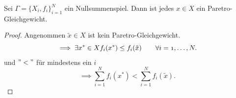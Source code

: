 \begin{satz}
	Sei $\Gamma = \{X_{i}, f_{i}\}_{i=1}^{N}$ ein
	Nullsummenspiel.  Dann ist jedes $x \in X$ ein
	Paretro-Gleichgewicht.
\end{satz}

\begin{proof}
	Angenommen $\tilde{x} \in X$ ist kein Paretro-Gleichgewicht.
	\[
		\implies \exists x^{*} \in X \mit f_{i}(x^{*}) \leq f_{i}(\tilde{x}) \qquad \forall i=1, \ldots, N
	.\] und $"<"$ für mindestens ein $i$
	\[
		\implies \sum_{i=1}^{N}{f_{i}(x^{*})} < \sum_{i=1}^{N}{f_{i}(\tilde{x})}
	.\] 
\end{proof}

